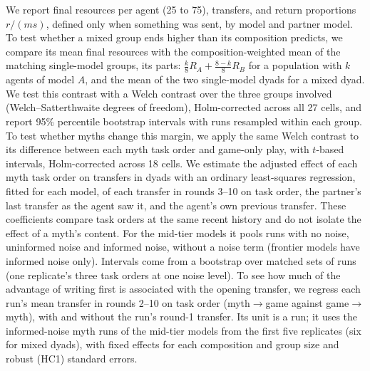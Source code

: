 We report final resources per agent (25 to 75), transfers, and return proportions $r/(ms)$, defined only when something was sent, by model and partner model. To test whether a mixed group ends higher than its composition predicts, we compare its mean final resources with the composition-weighted mean of the matching single-model groups, its parts: $\tfrac{k}{8}R_A+\tfrac{8-k}{8}R_B$ for a population with $k$ agents of model $A$, and the mean of the two single-model dyads for a mixed dyad. We test this contrast with a Welch contrast over the three groups involved (Welch--Satterthwaite degrees of freedom), Holm-corrected across all 27 cells, and report 95\% percentile bootstrap intervals with runs resampled within each group. To test whether myths change this margin, we apply the same Welch contrast to its difference between each myth task order and game-only play, with $t$-based intervals, Holm-corrected across 18 cells. We estimate the adjusted effect of each myth task order on transfers in dyads with an ordinary least-squares regression, fitted for each model, of each transfer in rounds 3--10 on task order, the partner's last transfer as the agent saw it, and the agent's own previous transfer. These coefficients compare task orders at the same recent history and do not isolate the effect of a myth's content. For the mid-tier models it pools runs with no noise, uninformed noise and informed noise, without a noise term (frontier models have informed noise only). Intervals come from a bootstrap over matched sets of runs (one replicate's three task orders at one noise level). To see how much of the advantage of writing first is associated with the opening transfer, we regress each run's mean transfer in rounds 2--10 on task order (myth$\rightarrow$game against game$\rightarrow$myth), with and without the run's round-1 transfer. Its unit is a run; it uses the informed-noise myth runs of the mid-tier models from the first five replicates (six for mixed dyads), with fixed effects for each composition and group size and robust (HC1) standard errors.

